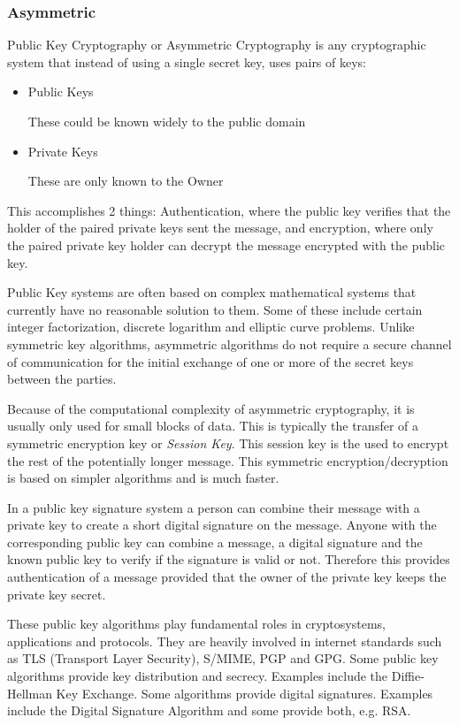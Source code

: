 \subsubsection{Asymmetric}

Public Key Cryptography or Asymmetric Cryptography is any cryptographic system that instead of using a single secret key, uses pairs of keys:
\begin{itemize}
\item{Public Keys

These could be known widely to the public domain}
\item{Private Keys

These are only known to the Owner}
\end{itemize}

This accomplishes 2 things: Authentication, where the public key verifies that the holder of the paired private keys sent the message, and encryption, where only the paired private key holder can decrypt the message encrypted with the public key.

Public Key systems are often based on complex mathematical systems that currently have no reasonable solution to them. Some of these include certain integer factorization, discrete logarithm and elliptic curve problems. Unlike symmetric key algorithms, asymmetric algorithms do not require a secure channel of communication for the initial exchange of one or more of the secret keys between the parties.

Because of the computational complexity of asymmetric cryptography, it is usually only used for small blocks of data. This is typically the transfer of a symmetric encryption key or \textit{Session Key}. This session key is the used to encrypt the rest of the potentially longer message. This symmetric encryption/decryption is based on simpler algorithms and is much faster.

In a public key signature system a person can combine their message with a private key to create a short digital signature on the message. Anyone with the corresponding public key can combine a message, a digital signature and the known public key to verify if the signature is valid or not. Therefore this provides authentication of a message provided that the owner of the private key keeps the private key secret. 

These public key algorithms play fundamental roles in cryptosystems, applications and protocols. They are heavily involved in internet standards such as TLS (Transport Layer Security), S/MIME, PGP and GPG. Some public key algorithms provide key distribution and secrecy. Examples include the Diffie-Hellman Key Exchange. Some algorithms provide digital signatures. Examples include the Digital Signature Algorithm and some provide both, e.g. RSA.

